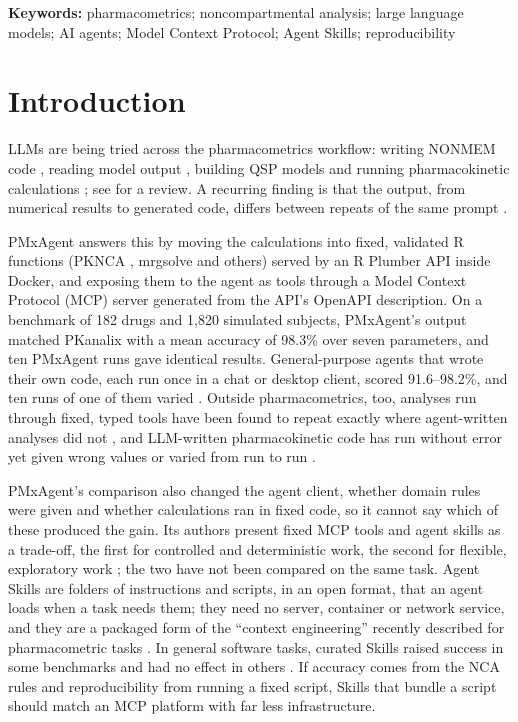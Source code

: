\documentclass[11pt]{article}
\begin{document}
\noindent\textbf{Keywords:} pharmacometrics; noncompartmental analysis; large language models; AI agents;
Model Context Protocol; Agent Skills; reproducibility

\section{Introduction}
LLMs are being tried across the pharmacometrics workflow: writing NONMEM code
\cite{shin2024nonmem,zheng2025nonmemcoding}, reading model output \cite{cha2025nonmemoutput}, building QSP models
\cite{saini2025qspcopilot} and running pharmacokinetic calculations \cite{shin2023chatgptpk}; see
\cite{tosca2025vision} for a review. A recurring finding is that the output, from numerical results to generated code, differs
between repeats of the same prompt \cite{shin2023chatgptpk,shin2024nonmem}.

PMxAgent \cite{bloomingdale2026pmxagent} answers this by moving the calculations into fixed, validated R functions
(PKNCA \cite{pknca,denney2015pknca}, mrgsolve \cite{mrgsolve} and others) served by an R Plumber API inside Docker, and
exposing them to the agent as tools through a Model Context Protocol (MCP) server \cite{mcp} generated from the API's
OpenAPI description. On a benchmark of 182 drugs and 1,820 simulated subjects, PMxAgent's output matched PKanalix
\cite{pkanalix} with a mean accuracy of 98.3\% over seven parameters, and ten PMxAgent runs gave identical results.
General-purpose agents that wrote their own code, each run once in a chat or desktop client, scored 91.6--98.2\%, and
ten runs of one of them varied \cite{bloomingdale2026pmxagent}. Outside pharmacometrics, too, analyses run through
fixed, typed tools have been found to repeat exactly where agent-written analyses did not
\cite{adamidis2026tool,dunn2026reproducible}, and LLM-written pharmacokinetic code has run without error yet given wrong
values \cite{omote2026silent} or varied from run to run \cite{kwack2026pkgpt}.

PMxAgent's comparison also changed the agent client, whether domain rules were given and whether calculations ran in
fixed code, so it cannot say which of these produced the gain. Its authors present fixed MCP tools and agent skills as
a trade-off, the first for controlled and deterministic work, the second for flexible, exploratory work
\cite{bloomingdale2026pmxagent}; the two have not been compared on the same task. Agent Skills
\cite{agentskills,agentskillsspec} are folders of instructions and scripts, in an open format, that an agent loads when a
task needs them; they need no server, container or network service, and they are a packaged form of the ``context
engineering'' recently described for pharmacometric tasks \cite{pritchardbell2026context}. In general software tasks,
curated Skills raised success in some benchmarks and had no effect in others \cite{li2026skillsbench,han2026sweskills}.
If accuracy comes from the NCA rules and reproducibility from running a fixed script, Skills that bundle a script should
match an MCP platform with far less infrastructure.
\end{document}
